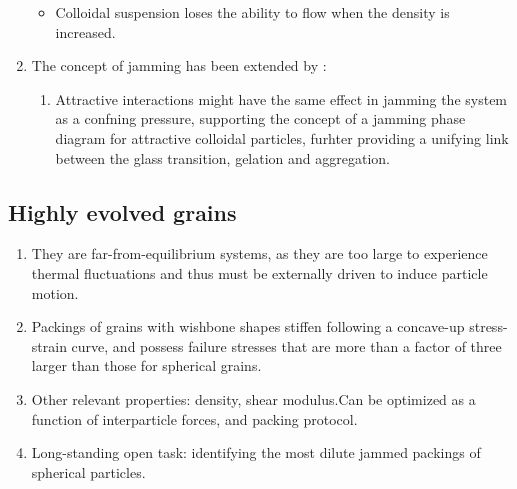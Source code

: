 \documentclass[10pt,a4paper]{article}
\begin{document}
\begin{enumerate}
\begin{itemize}
  \item Colloidal suspension loses the ability to flow when the density is increased. 
 \end{itemize}
 \item The concept of jamming has been extended by \cite{weitz01}:
 \begin{enumerate}
  \item Attractive interactions might have the same effect in jamming the system as a confning pressure,
  supporting the concept of a jamming phase diagram for attractive colloidal particles, 
  furhter providing a unifying link between the glass transition, gelation and aggregation.
 \end{enumerate}


\end{enumerate}

\subsection{Highly evolved grains \cite{ohern:13}}
\begin{enumerate}
 \item They are far-from-equilibrium systems, as they are too large to experience thermal fluctuations and thus must be externally driven to induce particle motion.
 \item Packings of grains with wishbone shapes stiffen following a concave-up stress-strain curve, 
 and possess failure stresses that are more than a factor of three larger than those for spherical grains.
 \item Other relevant properties: density, shear modulus.Can be optimized as a function of interparticle forces, and packing protocol.
 \item Long-standing open task: identifying the most dilute jammed packings of spherical particles.
\end{enumerate}
\end{document}
